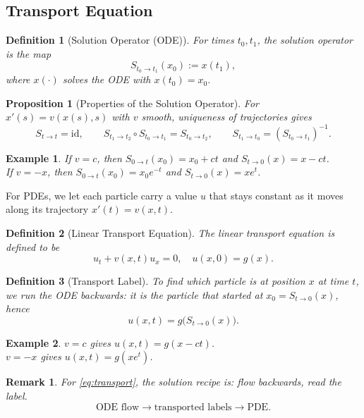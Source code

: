 \documentclass{article}
\newtheorem{definition}{Definition}
\newtheorem*{example}{Example}
\newtheorem{remark}{Remark}
\newtheorem{proposition}{Proposition}
\begin{document}
\subsection{Transport Equation}
\begin{definition}[Solution Operator (ODE)]
    For times $t_0,t_1$, the solution operator is the map
    \[S_{t_0\to t_1}(x_0):=x(t_1),\]
    where $x(\cdot)$ solves the ODE with $x(t_0)=x_0$.
\end{definition}
\begin{proposition}[Properties of the Solution Operator]
    For $x'(s) = v(x(s),s)$ with $v$ smooth, uniqueness of trajectories gives
    \[S_{t\to t} = \text{id}, \qquad S_{t_1\to t_2}\circ S_{t_0\to t_1} = S_{t_0\to t_2}, \qquad S_{t_1\to t_0} = \left(S_{t_0\to t_1}\right)^{-1}.\]
\end{proposition}
\begin{example}
    If $v = c$, then $S_{0\to t}(x_0) = x_0 + ct$ and $S_{t\to 0}(x) = x - ct$.\\
    If $v = -x$, then $S_{0\to t}(x_0) = x_0 e^{-t}$ and $S_{t\to 0}(x) = x e^{t}$.
\end{example}
For PDEs, we let each particle carry a value $u$ that stays constant as it moves along its trajectory $x'(t) = v(x,t)$.
\begin{definition}[Linear Transport Equation]
    The linear transport equation is defined to be
    \begin{equation}
        \label{eq:transport}
        u_t+v(x,t)u_x=0,\quad u(x,0)=g(x).
    \end{equation}
\end{definition}
\begin{definition}[Transport Label]
    To find which particle is at position $x$ at time $t$, we run the ODE backwards: it is the particle that started at $x_0 = S_{t\to0}(x)$, hence
    \[u(x,t) = g\big(S_{t\to 0}(x)\big).\]
\end{definition}
\begin{example}
    $v = c$ gives $u(x,t) = g(x-ct)$.\\
    $v = -x$ gives $u(x,t) = g(xe^t)$.
\end{example}
\begin{remark}
    For \eqref{eq:transport}, the solution recipe is: flow backwards, read the label.
    \[\text{ODE flow}\to\text{transported labels}\to\text{PDE}.\]
\end{remark}
\end{document}
